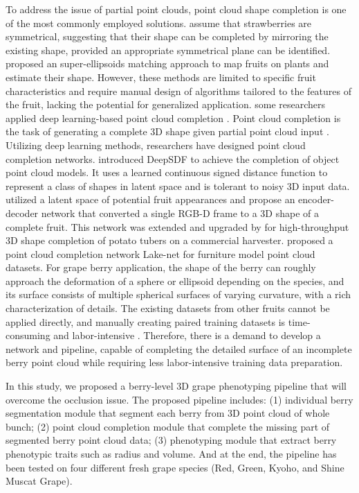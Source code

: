 \documentclass[12pt]{article}
\begin{document}
To address the issue of partial point clouds, point cloud shape completion is one of the most commonly employed solutions.
\citet{ge_symmetrybased_2020} assume that strawberries are symmetrical, suggesting that their shape can be completed by mirroring the existing shape, provided an appropriate symmetrical plane can be identified.
\citet{marangoz_fruit_2022} proposed an super-ellipsoids matching approach to map fruits on plants and estimate their shape.
However, these methods are limited to specific fruit characteristics and require manual design of algorithms tailored to the features of the fruit, lacking the potential for generalized application.
some researchers applied deep learning-based point cloud completion \citep{wang_unsupervised_2021}. 
Point cloud completion is the task of generating a complete 3D shape given partial point cloud input \citep{tesema_point_2024}. 
Utilizing deep learning methods, researchers have designed point cloud completion networks. 
\citet{park_deepsdf_2019} introduced DeepSDF to achieve the completion of object point cloud models. It uses a learned continuous signed distance function to represent a class of shapes in latent space and is tolerant to noisy 3D input data. 
\citet{magistri_contrastive_2022} utilized a latent space of potential fruit appearances and propose an encoder-decoder network that converted a single RGB-D frame to a 3D shape of a complete fruit. 
This network was extended and upgraded by \citet{blok_highthroughput_2025} for high-throughput 3D shape completion of potato tubers on a commercial harvester.
\citet{tang_lakenet_2022} proposed a point cloud completion network Lake-net for furniture model point cloud datasets. 
For grape berry application, the shape of the berry can roughly approach the deformation of a sphere or ellipsoid depending on the species, and its surface consists of multiple spherical surfaces of varying curvature, with a rich characterization of details. 
The existing datasets from other fruits cannot be applied directly, and manually creating paired training datasets is time-consuming and labor-intensive \citep{blok_highthroughput_2025}.
Therefore, there is a demand to develop a network and pipeline, capable of completing the detailed surface of an incomplete berry point cloud while requiring less labor-intensive training data preparation.

In this study, we proposed a berry-level 3D grape phenotyping pipeline that will overcome the occlusion issue. 
The proposed pipeline includes: 
(1) individual berry segmentation module that segment each berry from 3D point cloud of whole bunch; 
(2) point cloud completion module that complete the missing part of segmented berry point cloud data; 
(3) phenotyping module that extract berry phenotypic traits such as radius and volume. 
And at the end, the pipeline has been tested on four different fresh grape species (Red, Green, Kyoho, and Shine Muscat Grape).
\end{document}
